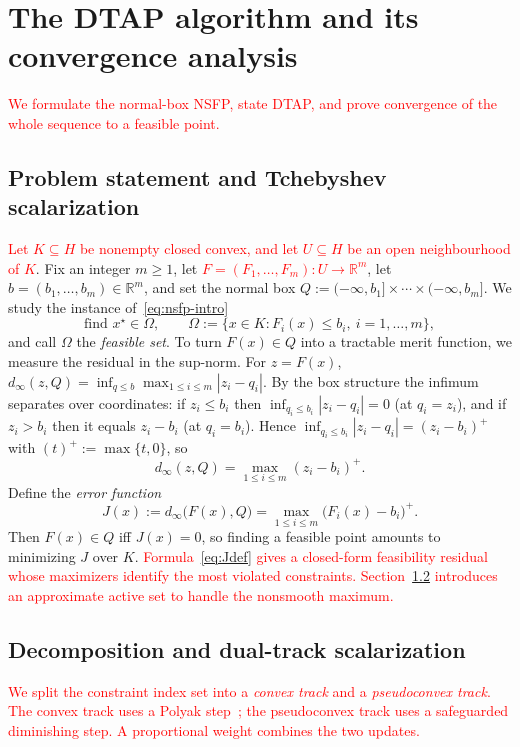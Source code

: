 \documentclass[]{interact}
\theoremstyle{plain}
\theoremstyle{definition}
\theoremstyle{remark}
\newcommand{\R}{\mathbb{R}}
\newcommand{\abs}[1]{\left\lvert #1 \right\rvert}
\begin{document}
\section{The DTAP algorithm and its convergence analysis}\label{sec:convergence}
\leavevmode\textcolor{red}{We formulate the normal-box NSFP, state DTAP, and prove convergence of the whole sequence
to a feasible point.}

\subsection{Problem statement and Tchebyshev scalarization}\label{ssec:model-stmt}
\leavevmode\textcolor{red}{Let $K\subseteq H$ be nonempty closed convex, and let $U\subseteq H$ be an open
neighbourhood of $K$}. Fix an integer $m\ge1$, let \leavevmode\textcolor{red}{$F=(F_1,\dots,F_m):U\to\R^m$},
let $b=(b_1,\dots,b_m)\in\R^m$, and set the normal box
$Q:=(-\infty,b_1]\times\cdots\times(-\infty,b_m]$. We study the instance
of~\eqref{eq:nsfp-intro}
\begin{equation}\label{eq:nsfp-box}
\text{find } x^\star\in\Omega,\qquad
\Omega:=\bigl\{x\in K: F_i(x)\le b_i,\ i=1,\dots,m\bigr\},
\end{equation}
and call $\Omega$ the \emph{feasible set}. To turn $F(x)\in Q$ into a tractable merit
function, we measure the residual in the sup-norm. For $z=F(x)$,
$d_\infty(z,Q)=\inf_{q\le b}\max_{1\le i\le m}\abs{z_i-q_i}$. By the box structure the
infimum separates over coordinates: if $z_i\le b_i$ then
$\inf_{q_i\le b_i}\abs{z_i-q_i}=0$ (at $q_i=z_i$), and if $z_i>b_i$ then it equals
$z_i-b_i$ (at $q_i=b_i$). Hence $\inf_{q_i\le b_i}\abs{z_i-q_i}=(z_i-b_i)^+$ with
$(t)^+:=\max\{t,0\}$, so
\begin{equation}\label{eq:dinfty}
d_\infty(z,Q)=\max_{1\le i\le m}(z_i-b_i)^+ .
\end{equation}
Define the \emph{error function}
\begin{equation}\label{eq:Jdef}
J(x):=d_\infty\bigl(F(x),Q\bigr)=\max_{1\le i\le m}\bigl(F_i(x)-b_i\bigr)^+ .
\end{equation}
Then $F(x)\in Q$ iff $J(x)=0$, so finding a feasible point amounts to minimizing $J$
over $K$. \leavevmode\textcolor{red}{Formula~\eqref{eq:Jdef} gives a closed-form feasibility residual whose
maximizers identify the most violated constraints. Section~\ref{ssec:dual-track}
introduces an approximate active set to handle the nonsmooth maximum.}

\subsection{Decomposition and dual-track scalarization}\label{ssec:dual-track}
\leavevmode\textcolor{red}{We split the constraint index set into a \emph{convex track} and a
\emph{pseudoconvex track}. The convex track uses a Polyak step~\citep{polyak1969};
the pseudoconvex track uses a safeguarded diminishing step.
A proportional weight combines the two updates.}
\end{document}
